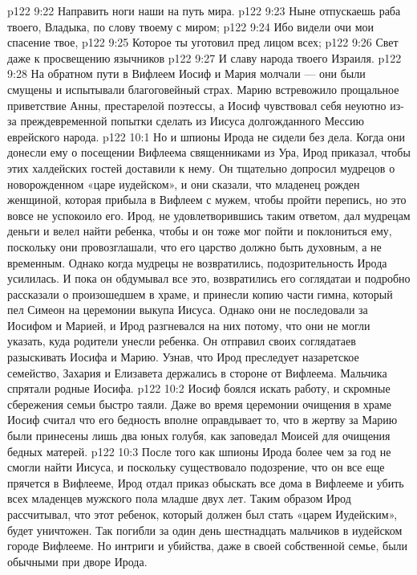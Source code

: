 \vs p122 9:22 Направить ноги наши на путь мира.
\vs p122 9:23 Ныне отпускаешь раба твоего, Владыка, по слову твоему с миром;
\vs p122 9:24 Ибо видели очи мои спасение твое,
\vs p122 9:25 Которое ты уготовил пред лицом всех;
\vs p122 9:26 Свет даже к просвещению язычников
\vs p122 9:27 И славу народа твоего Израиля.
\vs p122 9:28 \pc На обратном пути в Вифлеем Иосиф и Мария молчали --- они были смущены и испытывали благоговейный страх. Марию встревожило прощальное приветствие Анны, престарелой поэтессы, а Иосиф чувствовал себя неуютно из\hyp{}за преждевременной попытки сделать из Иисуса долгожданного Мессию еврейского народа.
\vs p122 10:1 Но и шпионы Ирода не сидели без дела. Когда они донесли ему о посещении Вифлеема священниками из Ура, Ирод приказал, чтобы этих халдейских гостей доставили к нему. Он тщательно допросил мудрецов о новорожденном «царе иудейском», и они сказали, что младенец рожден женщиной, которая прибыла в Вифлеем с мужем, чтобы пройти перепись, но это вовсе не успокоило его. Ирод, не удовлетворившись таким ответом, дал мудрецам деньги и велел найти ребенка, чтобы и он тоже мог пойти и поклониться ему, поскольку они провозглашали, что его царство должно быть духовным, а не временным. Однако когда мудрецы не возвратились, подозрительность Ирода усилилась. И пока он обдумывал все это, возвратились его соглядатаи и подробно рассказали о произошедшем в храме, и принесли копию части гимна, который пел Симеон на церемонии выкупа Иисуса. Однако они не последовали за Иосифом и Марией, и Ирод разгневался на них потому, что они не могли указать, куда родители унесли ребенка. Он отправил своих соглядатаев разыскивать Иосифа и Марию. Узнав, что Ирод преследует назаретское семейство, Захария и Елизавета держались в стороне от Вифлеема. Мальчика спрятали родные Иосифа.
\vs p122 10:2 Иосиф боялся искать работу, и скромные сбережения семьи быстро таяли. Даже во время церемонии очищения в храме Иосиф считал что его бедность вполне оправдывает то, что в жертву за Марию были принесены лишь два юных голубя, как заповедал Моисей для очищения бедных матерей.
\vs p122 10:3 После того как шпионы Ирода более чем за год не смогли найти Иисуса, и поскольку существовало подозрение, что он все еще прячется в Вифлееме, Ирод отдал приказ обыскать все дома в Вифлееме и убить всех младенцев мужского пола младше двух лет. Таким образом Ирод рассчитывал, что этот ребенок, который должен был стать «царем Иудейским», будет уничтожен. Так погибли за один день шестнадцать мальчиков в иудейском городе Вифлееме. Но интриги и убийства, даже в своей собственной семье, были обычными при дворе Ирода.
